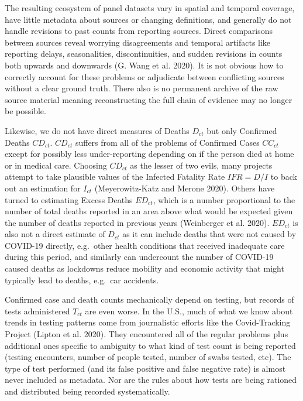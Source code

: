 \documentclass[10pt,letterpaper]{article}
\begin{document}
The resulting ecosystem of panel datasets vary in spatial and temporal
coverage, have little metadata about sources or changing definitions,
and generally do not handle revisions to past counts from reporting
sources. Direct comparisons between sources reveal worrying
disagreements and temporal artifacts like reporting delays,
seasonalities, discontinuities, and sudden revisions in counts both
upwards and downwards (G. Wang et al. 2020). It is not obvious how to
correctly account for these problems or adjudicate between conflicting
sources without a clear ground truth. There also is no permanent archive
of the raw source material meaning reconstructing the full chain of
evidence may no longer be possible.

Likewise, we do not have direct measures of Deaths \(D_{ct}\) but only
Confirmed Deaths \(CD_{ct}\). \(CD_{ct}\) suffers from all of the
problems of Confirmed Cases \(CC_{ct}\) except for possibly less
under-reporting depending on if the person died at home or in medical
care. Choosing \(CD_{ct}\) as the lesser of two evils, many projects
attempt to take plausible values of the Infected Fatality Rate
\(IFR=D/I\) to back out an estimation for \(I_{ct}\) (Meyerowitz-Katz
and Merone 2020). Others have turned to estimating Excess Deaths
\(ED_{ct}\), which is a number proportional to the number of total
deaths reported in an area above what would be expected given the number
of deaths reported in previous years (Weinberger et al. 2020).
\(ED_{ct}\) is also not a direct estimate of \(D_{ct}\) as it can
include deaths that were not caused by COVID-19 directly, e.g.~other
health conditions that received inadequate care during this period, and
similarly can undercount the number of COVID-19 caused deaths as
lockdowns reduce mobility and economic activity that might typically
lead to deaths, e.g.~car accidents.

Confirmed case and death counts mechanically depend on testing, but
records of tests administered \(T_{ct}\) are even worse. In the U.S.,
much of what we know about trends in testing patterns come from
journalistic efforts like the Covid-Tracking Project (Lipton et al.
2020). They encountered all of the regular problems plus additional ones
specific to ambiguity to what kind of test count is being reported
(testing encounters, number of people tested, number of swabs tested,
etc). The type of test performed (and its false positive and false
negative rate) is almost never included as metadata. Nor are the rules
about how tests are being rationed and distributed being recorded
systematically.
\end{document}
